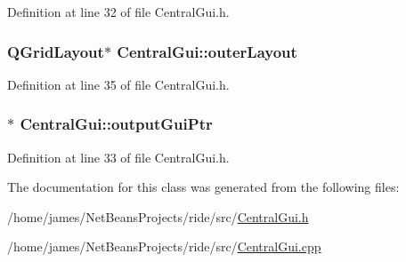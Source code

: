 Definition at line 32 of file Central\-Gui.\-h.

\hypertarget{class_central_gui_ab10e8028968ca8d5bf7b2cfe4b257d52}{
\subsubsection[{outer\-Layout}]{\setlength{\rightskip}{0pt plus 5cm}Q\-Grid\-Layout$\ast$ Central\-Gui\-::outer\-Layout\hspace{0.3cm}{\ttfamily [private]}}}\label{class_central_gui_ab10e8028968ca8d5bf7b2cfe4b257d52}


Definition at line 35 of file Central\-Gui.\-h.

\hypertarget{class_central_gui_a60c563767906a6db0c209f0b21437a09}{
\subsubsection[{output\-Gui\-Ptr}]{$\ast$ Central\-Gui\-::output\-Gui\-Ptr\hspace{0.3cm}{\ttfamily [private]}}}\label{class_central_gui_a60c563767906a6db0c209f0b21437a09}


Definition at line 33 of file Central\-Gui.\-h.



The documentation for this class was generated from the following files\-:\begin{DoxyCompactItemize}
\item 
/home/james/\-Net\-Beans\-Projects/ride/src/\hyperlink{_central_gui_8h}{Central\-Gui.\-h}\item 
/home/james/\-Net\-Beans\-Projects/ride/src/\hyperlink{_central_gui_8cpp}{Central\-Gui.\-cpp}\end{DoxyCompactItemize}
